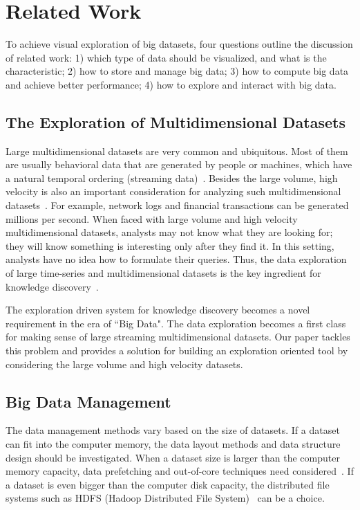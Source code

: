 \section{Related Work}

To achieve visual exploration of big datasets, four questions outline the discussion of related work: 1) which type of data should be visualized, and what is the characteristic; 2) how to store and manage big data; 3) how to compute big data and achieve better performance; 4) how to explore and interact with big data.

\subsection{The Exploration of Multidimensional Datasets}
Large multidimensional datasets are very common and ubiquitous. Most of them are usually behavioral data that are generated by people or machines, which have a natural temporal ordering (streaming data)~\cite{Canny}. Besides the large volume,  high velocity is also an important consideration for analyzing such multidimensional datasets~\cite{IBM2011}. For example, network logs and financial transactions can be generated millions per second. When faced with large volume and high velocity multidimensional datasets, analysts may not know what they are looking for; they will know something is interesting only after they find it. In this setting,  analysts have no idea how to formulate their queries. Thus, the data exploration of large time-series and multidimensional datasets is the key ingredient for knowledge discovery~\cite{harvard}.

The exploration driven system for knowledge discovery becomes a novel requirement in the era of ``Big Data". The data exploration becomes a first class for making sense of large streaming multidimensional datasets. Our paper tackles this problem and provides a solution for building an exploration oriented tool by considering the large volume and high velocity datasets.

\subsection{Big Data Management}
The data management methods vary based on the size of datasets. If a dataset can fit into the computer memory,  the data layout methods and data structure design should be investigated. When a dataset size is larger than the computer memory capacity, data prefetching and out-of-core techniques need considered~\cite{OFC}. If a dataset is even bigger than the computer disk capacity, the distributed file systems such as HDFS (Hadoop Distributed File System)~\cite{HDFS} can be a choice. 

